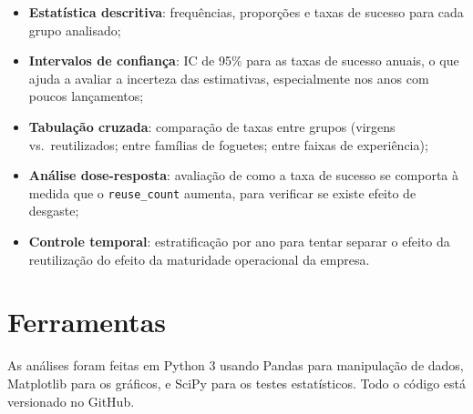 \begin{itemize}
    \item \textbf{Estatística descritiva}: frequências, proporções e taxas de sucesso para cada grupo analisado;
    \item \textbf{Intervalos de confiança}: IC de 95\% para as taxas de sucesso anuais, o que ajuda a avaliar a incerteza das estimativas, especialmente nos anos com poucos lançamentos;
    \item \textbf{Tabulação cruzada}: comparação de taxas entre grupos (virgens vs.\ reutilizados; entre famílias de foguetes; entre faixas de experiência);
    \item \textbf{Análise dose-resposta}: avaliação de como a taxa de sucesso se comporta à medida que o \texttt{reuse\_count} aumenta, para verificar se existe efeito de desgaste;
    \item \textbf{Controle temporal}: estratificação por ano para tentar separar o efeito da reutilização do efeito da maturidade operacional da empresa.
\end{itemize}

\section{Ferramentas}

As análises foram feitas em Python 3 usando Pandas \cite{mckinney2010pandas} para manipulação de dados, Matplotlib \cite{hunter2007matplotlib} para os gráficos, e SciPy \cite{virtanen2020scipy} para os testes estatísticos. Todo o código está versionado no GitHub.
